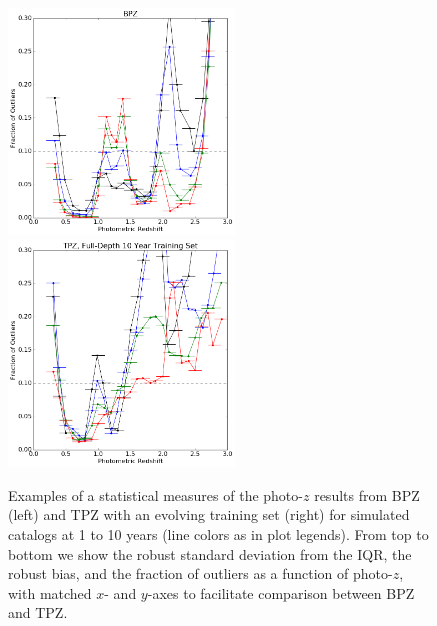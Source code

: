 \documentclass[DM,lsstdraft,toc]{lsstdoc}
\begin{document}
\begin{figure}
\begin{center}
\includegraphics[width=6cm]{figures/BPZ_Euclid_fout.png}
\includegraphics[width=6cm]{figures/TPZ_Euclid_TFD_fout.png}
\caption{Examples of a statistical measures of the photo-$z$ results from BPZ (left) and TPZ with an evolving training set (right) for simulated catalogs at 1 to 10 years (line colors as in plot legends). From top to bottom we show the robust standard deviation from the IQR, the robust bias, and the fraction of outliers as a function of photo-$z$, with matched $x$- and $y$-axes to facilitate comparison between BPZ and TPZ. \label{fig:stats}}
\end{center}
\end{figure}
\end{document}
